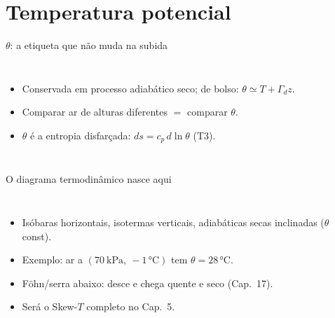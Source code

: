 \documentclass[aspectratio=169,11pt]{beamer}
\begin{document}
\section{Temperatura potencial}

\begin{frame}{$\theta$: a etiqueta que não muda na subida}
  \begin{columns}
    \vspace{0.4em}
    \begin{itemize}
      \item Conservada em processo adiabático seco; de bolso:
            $\theta \simeq T + \Gamma_d z$.
      \item Comparar ar de alturas diferentes $=$ comparar $\theta$.
      \item $\theta$ é a entropia disfarçada: $ds = c_p\,d\ln\theta$
            (T3).
    \end{itemize}
  \end{columns}
\end{frame}

\begin{frame}{O diagrama termodinâmico nasce aqui}
  \begin{columns}
    \begin{itemize}
      \item Isóbaras horizontais, isotermas verticais, adiabáticas
            secas inclinadas ($\theta$ const).
      \item Exemplo: ar a $(70\ \mathrm{kPa},\ -1\,°\mathrm{C})$ tem
            $\theta = 28\,°$C.
      \item Föhn/serra abaixo: desce e chega \alert{quente e seco}
            (Cap.~17).
      \item Será o Skew-$T$ completo no Cap.~5.
    \end{itemize}
  \end{columns}
\end{frame}
\end{document}
